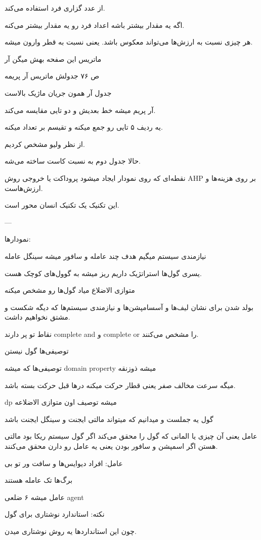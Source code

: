 از عدد گزاری فرد استفاده می‌کند.

اگه یه مقدار بیشتر باشه اعداد فرد رو یه مقدار بیشتر می‌کنه.

هر چیزی نسبت به ارزش‌ها می‌تواند معکوس باشد. یعنی نسبت به قطر وارون میشه.

ماتریس این صفحه بهش میگن آر

ص ۷۶ جدولش ماتریس آر پریمه

جدول آر همون جریان ماژیک بالاست

آر پریم میشه خط بعدیش و دو تایی مقایسه می‌کند.

یه ردیف ۵ تایی رو جمع میکنه و تقیسم بر تعداد میکنه.

از نظر ولیو مشخص کردیم.

حالا جدول دوم به نسبت کاست ساخته می‌شه.

نقطه‌ای که روی نمودار ایجاد میشود پروداکت یا خروجی روش AHP بر روی هزینه‌ها و
ارزش‌هاست.

این تکنیک یک تکنیک انسان محور است.

---

نمودار‌ها:

نیازمندی سیستم میگیم هدف چند عامله
و سافور میشه سینگل عامله

یسری گول‌ها استراتژیک داریم ریز میشه به گوول‌های کوچک هست.

متوازی الاضلاع میاد گول‌ها رو مشخص میکنه

بولد شدن برای نشان لیف‌ها و آسسامپشن‌ها و نیازمندی سیستم‌ها که دیگه شکست و مشتق
نخواهیم داشت.

نقاط تو پر دارند complete and و complete or را مشخص می‌کنند.

توصیفی‌ها گول نیستن

توصیفی‌ها که میشه domain property میشه ذوزنقه

میگه سرعت مخالف صفر یعنی قطار حرکت میکنه در‌ها قبل حرکت بسته باشد.

dp میشه توصیف اون متوازی الاضلاعه

گول یه جملست و میدانیم که میتواند مالتی ایجنت و سینگل ایجنت باشد

عامل یعنی آن چیزی یا المانی که گول را محقق می‌کند
اگر گول سیستم ریکا بود مالتی هستن
اگر اسمپشن و سافور بودن یعنی یه عامل رو دارن محقق می‌کنند.

عامل: افراد دیوایس‌ها و سافت ور تو بی

برگ‌ها تک عامله هستند

عامل میشه ۶ ضلعی agent

نکته: استاندارد نوشتاری برای گول

چون این استاندارد‌ها یه روش نوشتاری میدن.

